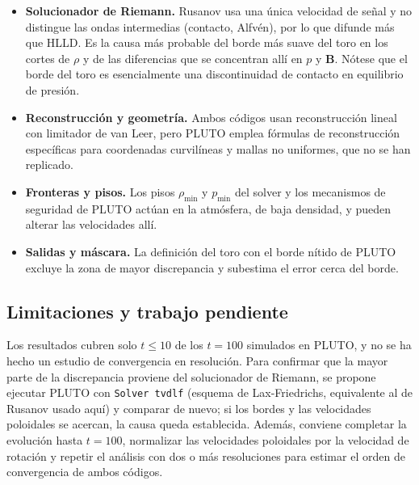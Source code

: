 \documentclass[11pt, letterpaper]{article}
\begin{document}
\begin{itemize}
    \item \textbf{Solucionador de Riemann.} Rusanov usa una única velocidad de señal y no distingue las ondas intermedias (contacto, Alfvén), por lo que difunde más que HLLD. Es la causa más probable del borde más suave del toro en los cortes de $\rho$ y de las diferencias que se concentran allí en $p$ y $\mathbf{B}$. Nótese que el borde del toro es esencialmente una discontinuidad de contacto en equilibrio de presión.
    \item \textbf{Reconstrucción y geometría.} Ambos códigos usan reconstrucción lineal con limitador de van Leer, pero PLUTO emplea fórmulas de reconstrucción específicas para coordenadas curvilíneas y mallas no uniformes, que no se han replicado.
    \item \textbf{Fronteras y pisos.} Los pisos $\rho_{\min}$ y $p_{\min}$ del solver y los mecanismos de seguridad de PLUTO actúan en la atmósfera, de baja densidad, y pueden alterar las velocidades allí.
    \item \textbf{Salidas y máscara.} La definición del toro con el borde nítido de PLUTO excluye la zona de mayor discrepancia y subestima el error cerca del borde.
\end{itemize}

\subsection{Limitaciones y trabajo pendiente}

Los resultados cubren solo $t\le10$ de los $t=100$ simulados en PLUTO, y no se ha hecho un estudio de convergencia en resolución. Para confirmar que la mayor parte de la discrepancia proviene del solucionador de Riemann, se propone ejecutar PLUTO con \lstinline|Solver tvdlf| (esquema de Lax-Friedrichs, equivalente al de Rusanov usado aquí) y comparar de nuevo; si los bordes y las velocidades poloidales se acercan, la causa queda establecida. Además, conviene completar la evolución hasta $t=100$, normalizar las velocidades poloidales por la velocidad de rotación y repetir el análisis con dos o más resoluciones para estimar el orden de convergencia de ambos códigos.
\end{document}

